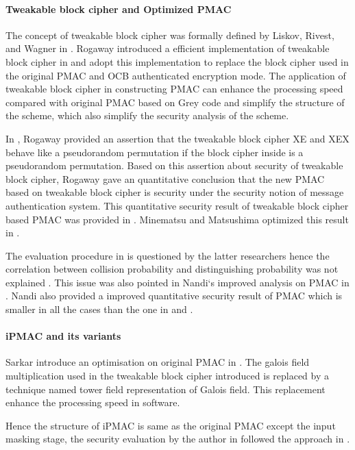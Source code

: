 \documentclass{article}
\begin{document}
\paragraph{Tweakable block cipher and Optimized PMAC}
The concept of tweakable block cipher was formally defined by Liskov, Rivest, and Wagner in \cite{tweak}. Rogaway introduced a efficient implementation of tweakable block cipher in \cite{tweak_pmac}and adopt this implementation to replace the block cipher used in the original PMAC and OCB authenticated encryption mode.
The application of tweakable block cipher in constructing PMAC can enhance the processing speed compared with original PMAC based on Grey code and simplify the structure of the scheme, which also simplify the security analysis of the scheme. 

In \cite{tweak_pmac}, Rogaway provided an assertion that the tweakable block cipher XE and XEX behave like a pseudorandom permutation if the block cipher inside is a pseudorandom permutation. Based on this assertion about security of tweakable block cipher, Rogaway gave an quantitative conclusion that the new PMAC based on tweakable block cipher is security under the security notion of message authentication system. This quantitative security result of tweakable block cipher based PMAC was provided in \cite{tweak_pmac}.
Minematsu and Matsushima optimized this result in \cite{new}. 

The evaluation procedure in \cite{pmac} is questioned by the latter researchers hence the correlation between collision probability and 
distinguishing probability was not explained . This issue was also pointed in Nandi`s improved analysis on PMAC in \cite{improve_pmac}. Nandi also provided a improved quantitative security result of PMAC which is smaller in all the cases than the one in \cite{pmac} and \cite{new}. 

\paragraph{iPMAC and its variants}
Sarkar introduce an optimisation on original PMAC in \cite{iPMAC}. The galois field multiplication used in the tweakable block cipher introduced is replaced by a technique named tower field representation of Galois field. This replacement enhance the processing speed in software.

Hence the structure of iPMAC is same as the original PMAC except the input masking stage, the security evaluation by the author in \cite{iPMAC} followed the approach in \cite{pmac}.
\end{document}
